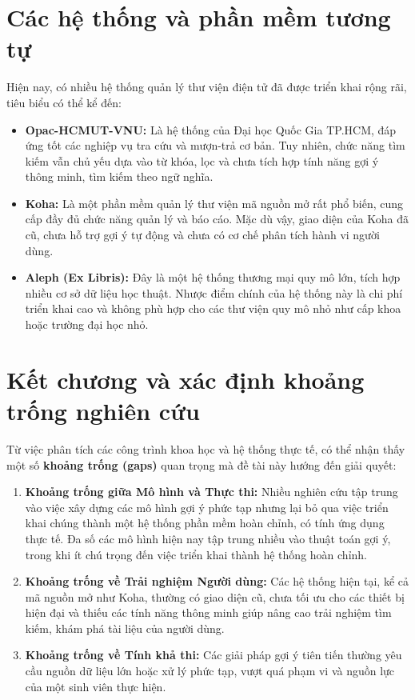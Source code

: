 \section{Các hệ thống và phần mềm tương tự}

Hiện nay, có nhiều hệ thống quản lý thư viện điện tử đã được triển khai rộng rãi, tiêu biểu có thể kể đến:

\begin{itemize}
    \item \textbf{Opac-HCMUT-VNU:} Là hệ thống của Đại học Quốc Gia TP.HCM, đáp ứng tốt các nghiệp vụ tra cứu và mượn-trả cơ bản. Tuy nhiên, chức năng tìm kiếm vẫn chủ yếu dựa vào từ khóa, lọc và chưa tích hợp tính năng gợi ý thông minh, tìm kiếm theo ngữ nghĩa.

    \item \textbf{Koha:} Là một phần mềm quản lý thư viện mã nguồn mở rất phổ biến, cung cấp đầy đủ chức năng quản lý và báo cáo. Mặc dù vậy, giao diện của Koha đã cũ, chưa hỗ trợ gợi ý tự động và chưa có cơ chế phân tích hành vi người dùng.

    \item \textbf{Aleph (Ex Libris):} Đây là một hệ thống thương mại quy mô lớn, tích hợp nhiều cơ sở dữ liệu học thuật. Nhược điểm chính của hệ thống này là chi phí triển khai cao và không phù hợp cho các thư viện quy mô nhỏ như cấp khoa hoặc trường đại học nhỏ.
\end{itemize}

\section{Kết chương và xác định khoảng trống nghiên cứu}

Từ việc phân tích các công trình khoa học và hệ thống thực tế, có thể nhận thấy một số \textbf{khoảng trống (gaps)} quan trọng mà đề tài này hướng đến giải quyết:

\begin{enumerate}
    \item \textbf{Khoảng trống giữa Mô hình và Thực thi:} Nhiều nghiên cứu tập trung vào việc xây dựng các mô hình gợi ý phức tạp nhưng lại bỏ qua việc triển khai chúng thành một hệ thống phần mềm hoàn chỉnh, có tính ứng dụng thực tế. Đa số các mô hình hiện nay tập trung nhiều vào thuật toán gợi ý, trong khi ít chú trọng đến việc triển khai thành hệ thống hoàn chỉnh.

    \item \textbf{Khoảng trống về Trải nghiệm Người dùng:} Các hệ thống hiện tại, kể cả mã nguồn mở như Koha, thường có giao diện cũ, chưa tối ưu cho các thiết bị hiện đại và thiếu các tính năng thông minh giúp nâng cao trải nghiệm tìm kiếm, khám phá tài liệu của người dùng.

    \item \textbf{Khoảng trống về Tính khả thi:} Các giải pháp gợi ý tiên tiến thường yêu cầu nguồn dữ liệu lớn hoặc xử lý phức tạp, vượt quá phạm vi và nguồn lực của một sinh viên thực hiện.
\end{enumerate}

